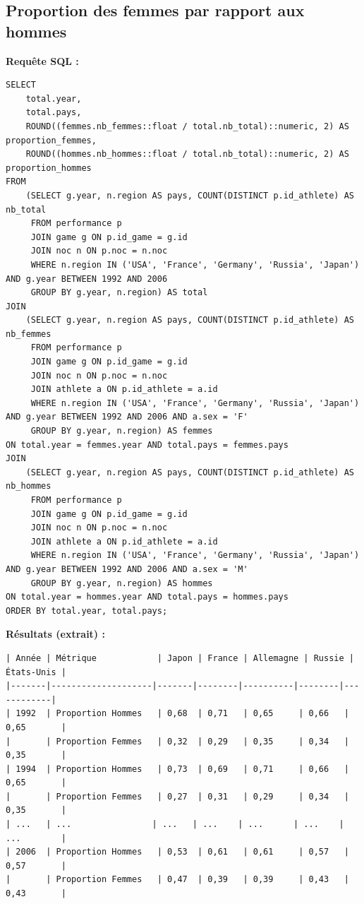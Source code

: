 \documentclass[fontsize=10pt,oneside]{scrreprt}
\begin{document}
\subsection{Proportion des femmes par rapport aux hommes}
\textbf{Requête SQL :}
\begin{verbatim}
SELECT 
    total.year, 
    total.pays, 
    ROUND((femmes.nb_femmes::float / total.nb_total)::numeric, 2) AS proportion_femmes, 
    ROUND((hommes.nb_hommes::float / total.nb_total)::numeric, 2) AS proportion_hommes 
FROM 
    (SELECT g.year, n.region AS pays, COUNT(DISTINCT p.id_athlete) AS nb_total 
     FROM performance p 
     JOIN game g ON p.id_game = g.id 
     JOIN noc n ON p.noc = n.noc 
     WHERE n.region IN ('USA', 'France', 'Germany', 'Russia', 'Japan') AND g.year BETWEEN 1992 AND 2006
     GROUP BY g.year, n.region) AS total
JOIN 
    (SELECT g.year, n.region AS pays, COUNT(DISTINCT p.id_athlete) AS nb_femmes 
     FROM performance p 
     JOIN game g ON p.id_game = g.id 
     JOIN noc n ON p.noc = n.noc 
     JOIN athlete a ON p.id_athlete = a.id 
     WHERE n.region IN ('USA', 'France', 'Germany', 'Russia', 'Japan') AND g.year BETWEEN 1992 AND 2006 AND a.sex = 'F'
     GROUP BY g.year, n.region) AS femmes
ON total.year = femmes.year AND total.pays = femmes.pays
JOIN 
    (SELECT g.year, n.region AS pays, COUNT(DISTINCT p.id_athlete) AS nb_hommes 
     FROM performance p 
     JOIN game g ON p.id_game = g.id 
     JOIN noc n ON p.noc = n.noc 
     JOIN athlete a ON p.id_athlete = a.id 
     WHERE n.region IN ('USA', 'France', 'Germany', 'Russia', 'Japan') AND g.year BETWEEN 1992 AND 2006 AND a.sex = 'M'
     GROUP BY g.year, n.region) AS hommes
ON total.year = hommes.year AND total.pays = hommes.pays
ORDER BY total.year, total.pays;
\end{verbatim}
\textbf{Résultats (extrait) :}
\begin{verbatim}
| Année | Métrique            | Japon | France | Allemagne | Russie | États-Unis |
|-------|--------------------|-------|--------|----------|--------|------------|
| 1992  | Proportion Hommes   | 0,68  | 0,71   | 0,65     | 0,66   | 0,65       |
|       | Proportion Femmes   | 0,32  | 0,29   | 0,35     | 0,34   | 0,35       |
| 1994  | Proportion Hommes   | 0,73  | 0,69   | 0,71     | 0,66   | 0,65       |
|       | Proportion Femmes   | 0,27  | 0,31   | 0,29     | 0,34   | 0,35       |
| ...   | ...                | ...   | ...    | ...      | ...    | ...        |
| 2006  | Proportion Hommes   | 0,53  | 0,61   | 0,61     | 0,57   | 0,57       |
|       | Proportion Femmes   | 0,47  | 0,39   | 0,39     | 0,43   | 0,43       |
\end{verbatim}
\end{document}
